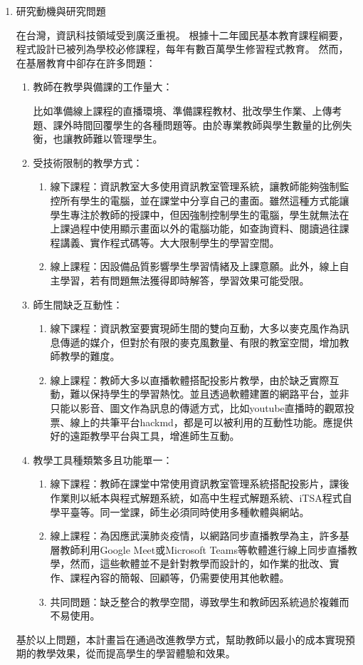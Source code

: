 \documentclass[12pt]{article}
\begin{document}
\begin{enumerate}
  \item 研究動機與研究問題
    \par 在台灣，資訊科技領域受到廣泛重視。
    根據十二年國民基本教育課程綱要\cite{ref2}，
    程式設計已被列為學校必修課程，每年有數百萬學生修習程式教育\cite{ref3}。
    然而，在基層教育中卻存在許多問題：
    \begin{enumerate}
      \setlength{\parindent}{2em}
      \item 教師在教學與備課的工作量大：
        \par 比如準備線上課程的直播環境、準備課程教材、批改學生作業、上傳考題、課外時間回覆學生的各種問題等\cite{ref4}。由於專業教師與學生數量的比例失衡，也讓教師難以管理學生\cite{ref5}。
      \item 受技術限制的教學方式：
        \begin{enumerate}
          \item 線下課程：資訊教室大多使用資訊教室管理系統\cite{ref6}，讓教師能夠強制監控所有學生的電腦，並在課堂中分享自己的畫面。雖然這種方式能讓學生專注於教師的授課中，但因強制控制學生的電腦，學生就無法在上課過程中使用顯示畫面以外的電腦功能，如查詢資料、閱讀過往課程講義、實作程式碼等。大大限制學生的學習空間。
          \item 線上課程：因設備品質影響學生學習情緒及上課意願\cite{ref7}。此外，線上自主學習，若有問題無法獲得即時解答，學習效果可能受限\cite{ref4}。
        \end{enumerate}
      \item 師生間缺乏互動性：
        \begin{enumerate}
          \item 線下課程：資訊教室要實現師生間的雙向互動，大多以麥克風作為訊息傳遞的媒介，但對於有限的麥克風數量、有限的教室空間，增加教師教學的難度。
          \item 線上課程：教師大多以直播軟體搭配投影片教學，由於缺乏實際互動，難以保持學生的學習熱忱\cite{ref7}。並且透過軟體建置的網路平台，並非只能以影音、圖文作為訊息的傳遞方式，比如youtube直播時的觀眾投票、線上的共筆平台hackmd，都是可以被利用的互動性功能。應提供好的遠距教學平台與工具，增進師生互動\cite{ref4}。
        \end{enumerate}
      \item 教學工具種類繁多且功能單一：
        \begin{enumerate}
          \item 線下課程：教師在課堂中常使用資訊教室管理系統搭配投影片，課後作業則以紙本與程式解題系統，如高中生程式解題系統、iTSA程式自學平臺等。同一堂課，師生必須同時使用多種軟體與網站。
          \item 線上課程：為因應武漢肺炎疫情，以網路同步直播教學為主，許多基層教師利用Google Meet或Microsoft Teams等軟體進行線上同步直播教學，然而，這些軟體並不是針對教學而設計的，如作業的批改、實作、課程內容的簡報、回顧等，仍需要使用其他軟體。
          \item 共同問題：缺乏整合的教學空間，導致學生和教師因系統過於複雜而不易使用。
        \end{enumerate}
    \end{enumerate}
    \par 基於以上問題，本計畫旨在通過改進教學方式，幫助教師以最小的成本實現預期的教學效果，從而提高學生的學習體驗和效果。
    

\end{enumerate}
\end{document}
